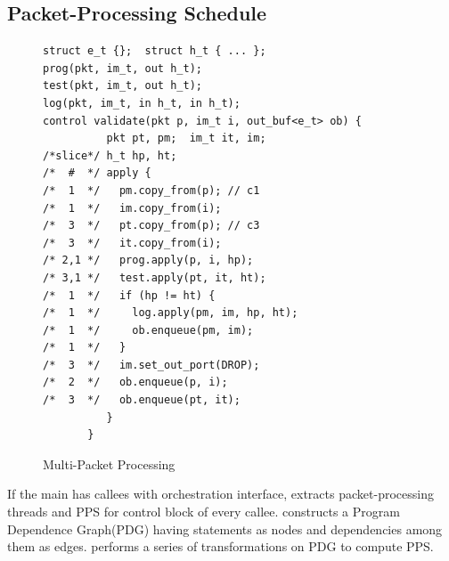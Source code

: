 \documentclass[letterpaper,twocolumn,10pt]{article}
\begin{document}
% 
% 





\subsection{Packet-Processing Schedule}
\label{subsubsection:packet-processing-schedule}


\begin{figure}[!h]
\begin{lstlisting}[frame=none]
struct e_t {};  struct h_t { ... };
prog(pkt, im_t, out h_t);
test(pkt, im_t, out h_t);
log(pkt, im_t, in h_t, in h_t);
control validate(pkt p, im_t i, out_buf<e_t> ob) {
          pkt pt, pm;  im_t it, im;  
/*slice*/ h_t hp, ht;
/*  #  */ apply {
/*  1  */   pm.copy_from(p); // c1
/*  1  */   im.copy_from(i);
/*  3  */   pt.copy_from(p); // c3 
/*  3  */   it.copy_from(i);
/* 2,1 */   prog.apply(p, i, hp); 
/* 3,1 */   test.apply(pt, it, ht); 
/*  1  */   if (hp != ht) {
/*  1  */     log.apply(pm, im, hp, ht);
/*  1  */     ob.enqueue(pm, im);
/*  1  */   }
/*  3  */   im.set_out_port(DROP);
/*  2  */   ob.enqueue(p, i);
/*  3  */   ob.enqueue(pt, it);
          }
       }
\end{lstlisting}
\caption{Multi-Packet Processing}
\label{fig:multi-packet-processing}
\end{figure}





If the main \uprogram has callees with orchestration interface, 
\ucomp 
extracts packet-processing threads and PPS for control block of every callee.
\ucomp constructs a Program Dependence Graph(PDG) 
\cite{Ferrante:1987:PDG:24039.24041} having statements as nodes and 
dependencies among them as edges. \ucomp  performs a series of transformations on PDG to compute PPS.
\end{document}
